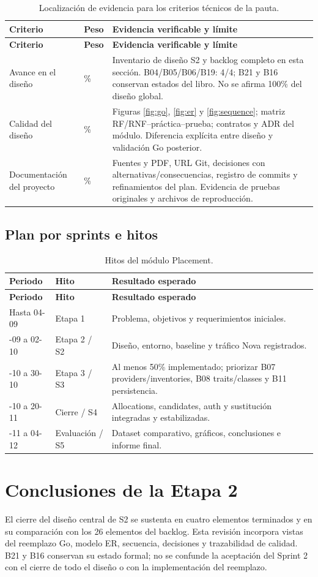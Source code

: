 \documentclass[12pt,a4paper]{article}
\newcommand{\reporttable}[4]{\begingroup\small\setlength{\LTpre}{8pt}\setlength{\LTpost}{8pt}\setlength{\tabcolsep}{4pt}\renewcommand{\arraystretch}{1.15}
\begin{longtable}{#2}\caption{#1}\\\toprule #3\\\midrule\endfirsthead
\toprule #3\\\midrule\endhead\bottomrule\endfoot #4\end{longtable}\endgroup}
\begin{document}
\reporttable{Localización de evidencia para los criterios técnicos de la pauta.}{>{\raggedright\arraybackslash}p{4.2cm}>{\raggedright\arraybackslash}p{1.1cm}>{\raggedright\arraybackslash}p{9.4cm}}{\textbf{Criterio}&\textbf{Peso}&\textbf{Evidencia verificable y límite}}{
Avance en el diseño&10\%&Inventario de diseño S2 y backlog completo en esta sección. B04/B05/B06/B19: 4/4; B21 y B16 conservan estados del libro. No se afirma 100\% del diseño global.\\*
Calidad del diseño&55\%&Figuras \ref{fig:go}, \ref{fig:er} y \ref{fig:sequence}; matriz RF/RNF--práctica--prueba; contratos y ADR del módulo. Diferencia explícita entre diseño y validación Go posterior.\\*
Documentación del proyecto&15\%&Fuentes y PDF, URL Git, decisiones con alternativas/consecuencias, registro de commits y refinamientos del plan. Evidencia de pruebas originales y archivos de reproducción.\\}

\Needspace{240pt}
\subsection{Plan por sprints e hitos}
\reporttable{Hitos del módulo Placement.}{>{\raggedright\arraybackslash}p{3.2cm}>{\raggedright\arraybackslash}p{2.4cm}>{\raggedright\arraybackslash}p{9.4cm}}{\textbf{Periodo}&\textbf{Hito}&\textbf{Resultado esperado}}{
Hasta 04-09&Etapa 1&Problema, objetivos y requerimientos iniciales.\\*
05-09 a 02-10&Etapa 2 / S2&Diseño, entorno, baseline y tráfico Nova registrados.\\*
03-10 a 30-10&Etapa 3 / S3&Al menos 50\% implementado; priorizar B07 providers/inventories, B08 traits/classes y B11 persistencia.\\*
31-10 a 20-11&Cierre / S4&Allocations, candidates, auth y sustitución integradas y estabilizadas.\\*
21-11 a 04-12&Evaluación / S5&Dataset comparativo, gráficos, conclusiones e informe final.\\}

\Needspace{320pt}
\section{Conclusiones de la Etapa 2}
El cierre del diseño central de S2 se sustenta en cuatro elementos terminados y en su comparación con los 26 elementos del backlog. Esta revisión incorpora vistas del reemplazo Go, modelo ER, secuencia, decisiones y trazabilidad de calidad. B21 y B16 conservan su estado formal; no se confunde la aceptación del Sprint 2 con el cierre de todo el diseño o con la implementación del reemplazo.
\end{document}
